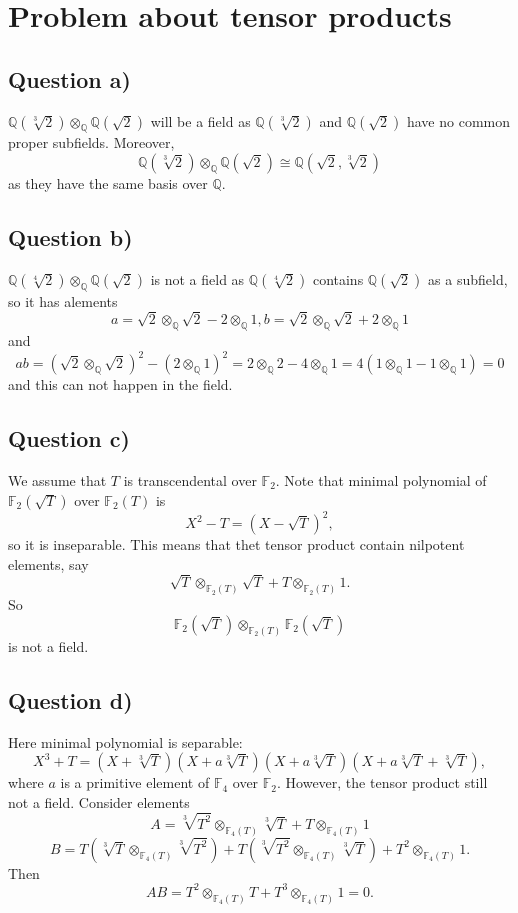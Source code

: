 \documentclass[12pt]{article}
\begin{document}
 \section{Problem about tensor products}
 \subsection*{Question a)}
  $\mathbb{Q}(\sqrt[3]{2}) \otimes_\mathbb{Q} \mathbb{Q}(\sqrt{2}) $ will be a field as 
$\mathbb{Q}(\sqrt[3]{2})$ and $\mathbb{Q}(\sqrt{2})$ have no common proper subfields. Moreover,
$$ \mathbb{Q}(\sqrt[3]{2})  \otimes_\mathbb{Q} \mathbb{Q}(\sqrt{2}) \cong \mathbb{Q}(\sqrt{2},\sqrt[3]{2})  $$ 
as they have the same basis over $\mathbb{Q}$.
\subsection*{Question b)}
 $\mathbb{Q}(\sqrt[4]{2}) \otimes_\mathbb{Q} \mathbb{Q}(\sqrt{2})$  
is not a field as $\mathbb{Q}(\sqrt[4]{2})$ 
contains $\mathbb{Q}(\sqrt{2})$ as a subfield, 
so it has alements 
$$ a = \sqrt{2} \otimes_{\mathbb{Q}} \sqrt{2} - 2 \otimes_\mathbb{Q} 1
, b = \sqrt{2} \otimes_{\mathbb{Q}} \sqrt{2} + 2 \otimes_\mathbb{Q} 1$$ and 
 $$               
 ab = 
(\sqrt{2} \otimes_{\mathbb{Q}} \sqrt{2})^2 - (2 \otimes_\mathbb{Q} 1)^2
  = 
 2 \otimes_{\mathbb{Q}} 2 - 4 \otimes_\mathbb{Q} 1 = 
 4 ( 1 \otimes_\mathbb{Q} 1  - 1 \otimes_\mathbb{Q} 1 ) = 0 
 $$ 
 and this can not  happen in the field.
 \subsection*{Question c)}
 We assume that $T$ is transcendental over $\mathbb{F}_2$.
 Note that minimal polynomial of  $\mathbb{F}_2(\sqrt{T})$ over $\mathbb{F}_2(T)$ is
 $$
   X^2 - T = (X - \sqrt{T})^2,
 $$
 so it is inseparable. This means that thet tensor product contain nilpotent elements, say
 $$
  \sqrt{T} \otimes_{\mathbb{F}_2(T)} \sqrt{T} + T \otimes_{\mathbb{F}_2(T)} 1.
 $$
 So $$ \mathbb{F}_2(\sqrt{T}) \otimes_{\mathbb{F}_2(T)} \mathbb{F}_2(\sqrt{T})$$ is not a field.
\subsection*{Question d)}
 Here  minimal polynomial is separable:
 $$
  X^3 + T = (X + \sqrt[3]{T})(X + a\sqrt[3]{T})(X + a\sqrt[3]T)(X + a\sqrt[3]T + \sqrt[3]T),
 $$
 where $a$ is a primitive element of $\mathbb{F}_4$ over $\mathbb{F}_2$.
 However, the tensor product still not a field. Consider elements
 $$
 A = \sqrt[3]{T^2} \otimes_{\mathbb{F}_4(T)} \sqrt[3]{T} + T \otimes_{\mathbb{F}_4(T)} 1
 $$ 
 $$
 B = T(\sqrt[3]{T} \otimes_{\mathbb{F}_4(T)}\sqrt[3]{T^2}) + T(\sqrt[3]{T^2} \otimes_{\mathbb{F}_4(T)}\sqrt[3]{T})  + T^2 \otimes_{\mathbb{F}_4(T)} 1 .
 $$
Then
 $$
  AB =  T^2 \otimes_{\mathbb{F}_4(T)} T + T^3 \otimes_{\mathbb{F}_4(T)} 1 = 0.
 $$
\end{document}
